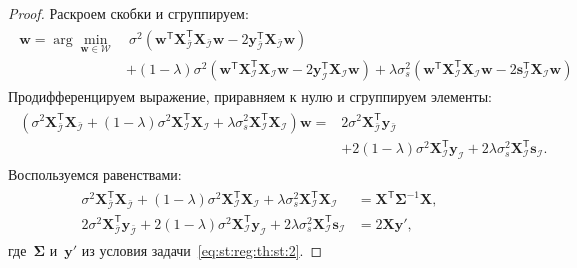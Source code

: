 \documentclass[12pt]{a&t}
\begin{document}
\begin{proof}
Раскроем скобки и сгруппируем:
\begin{gather}
\label{eq:st:reg:3}
\begin{aligned}
\hat{\mathbf{w}} = \arg\min_{\mathbf{w}\in \mathcal{W}} &~ \sigma^2\left(\mathbf{w}^{\mathsf{T}}\mathbf{X}^{\mathsf{T}}_{\bar{\mathcal{I}}}\mathbf{X}_{\bar{\mathcal{I}}}\mathbf{w} - 2\mathbf{y}^{\mathsf{T}}_{\bar{\mathcal{I}}}\mathbf{X}_{\bar{\mathcal{I}}}\mathbf{w}\right) \\
&+ \left(1-\lambda\right)\sigma^2\left(\mathbf{w}^{\mathsf{T}}\mathbf{X}^{\mathsf{T}}_{\mathcal{I}}\mathbf{X}_{\mathcal{I}}\mathbf{w}- 2\mathbf{y}^{\mathsf{T}}_{\mathcal{I}}\mathbf{X}_{\mathcal{I}}\mathbf{w}\right) + \lambda\sigma^2_s\left(\mathbf{w}^{\mathsf{T}}\mathbf{X}^{\mathsf{T}}_{\mathcal{I}}\mathbf{X}_{\mathcal{I}}\mathbf{w}- 2\mathbf{s}^{\mathsf{T}}_{\mathcal{I}}\mathbf{X}_{\mathcal{I}}\mathbf{w}\right)
\end{aligned}
\end{gather}
Продифференцируем выражение, приравняем к нулю и сгруппируем элементы:
\begin{gather}
\label{eq:st:reg:4}
\begin{aligned}
\left(\sigma^{2}\mathbf{X}^{\mathsf{T}}_{\bar{\mathcal{I}}}\mathbf{X}_{\bar{\mathcal{I}}} + \left(1-\lambda\right)\sigma^2\mathbf{X}^{\mathsf{T}}_{\mathcal{I}}\mathbf{X}_{\mathcal{I}} + \lambda\sigma^{2}_s\mathbf{X}^{\mathsf{T}}_{\mathcal{I}}\mathbf{X}_{\mathcal{I}}\right) \mathbf{w} =& 2\sigma^2\mathbf{X}^{\mathsf{T}}_{\bar{\mathcal{I}}}\mathbf{y}_{\bar{\mathcal{I}}} \\
&+ 2\left(1-\lambda\right)\sigma^2\mathbf{X}^{\mathsf{T}}_{\mathcal{I}}\mathbf{y}_{\mathcal{I}} + 2\lambda\sigma_s^2\mathbf{X}^{\mathsf{T}}_{\mathcal{I}}\mathbf{s}_{\mathcal{I}}.
\end{aligned}
\end{gather}
Воспользуемся равенствами:
\begin{gather}
\label{eq:st:reg:simp}
\begin{aligned}
\sigma^{2}\mathbf{X}^{\mathsf{T}}_{\bar{\mathcal{I}}}\mathbf{X}_{\bar{\mathcal{I}}} + \left(1-\lambda\right)\sigma^2\mathbf{X}^{\mathsf{T}}_{\mathcal{I}}\mathbf{X}_{\mathcal{I}} + \lambda\sigma^{2}_s\mathbf{X}^{\mathsf{T}}_{\mathcal{I}}\mathbf{X}_{\mathcal{I}} &= \mathbf{X}^{\mathsf{T}}\bm{\Sigma}^{-1}\mathbf{X},\\
2\sigma^2\mathbf{X}^{\mathsf{T}}_{\bar{\mathcal{I}}}\mathbf{y}_{\bar{\mathcal{I}}} + 2\left(1-\lambda\right)\sigma^2\mathbf{X}^{\mathsf{T}}_{\mathcal{I}}\mathbf{y}_{\mathcal{I}} + 2\lambda\sigma_s^2\mathbf{X}^{\mathsf{T}}_{\mathcal{I}}\mathbf{s}_{\mathcal{I}} &= 2\mathbf{X}\mathbf{y'},
\end{aligned}
\end{gather}
где~$\bm{\Sigma}$ и~$\mathbf{y'}$ из условия задачи~\eqref{eq:st:reg:th:st:2}.


\end{proof}
\end{document}
